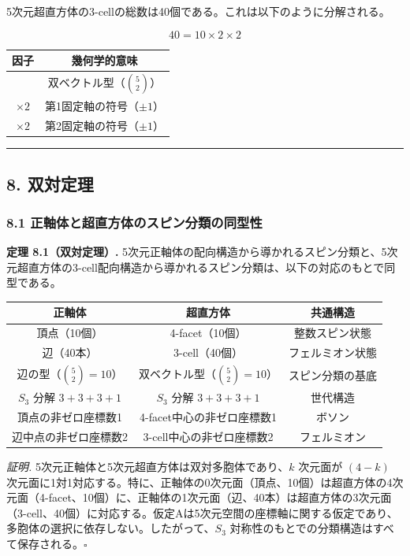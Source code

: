 \documentclass[a4paper,11pt]{ltjsarticle}
\newcounter{none}
\begin{document}
5次元超直方体の3-cellの総数は40個である。これは以下のように分解される。

\[40 = 10 \times 2 \times 2\]

{\def\LTcaptype{none}
\begin{longtable}[]{@{}cc@{}}
\toprule
因子 & 幾何学的意味 \\
\midrule
\endhead
\bottomrule
\endlastfoot
10 & 双ベクトル型（$\binom{5}{2}$） \\
$\times 2$ & 第1固定軸の符号（$\pm 1$） \\
$\times 2$ & 第2固定軸の符号（$\pm 1$） \\
\end{longtable}
}

\begin{center}\rule{0.5\linewidth}{0.5pt}\end{center}

\subsection*{8. 双対定理}

\subsubsection*{8.1 正軸体と超直方体のスピン分類の同型性}

\textbf{定理 8.1（双対定理）.} 5次元正軸体の配向構造から導かれるスピン分類と、5次元超直方体の3-cell配向構造から導かれるスピン分類は、以下の対応のもとで同型である。

{\def\LTcaptype{none}
\begin{longtable}[]{@{}ccc@{}}
\toprule
正軸体 & 超直方体 & 共通構造 \\
\midrule
\endhead
\bottomrule
\endlastfoot
頂点（10個） & 4-facet（10個） & 整数スピン状態 \\
辺（40本） & 3-cell（40個） & フェルミオン状態 \\
辺の型（$\binom{5}{2} = 10$） & 双ベクトル型（$\binom{5}{2} = 10$） & スピン分類の基底 \\
$S_3$ 分解 $3+3+3+1$ & $S_3$ 分解 $3+3+3+1$ & 世代構造 \\
頂点の非ゼロ座標数1 & 4-facet中心の非ゼロ座標数1 & ボソン \\
辺中点の非ゼロ座標数2 & 3-cell中心の非ゼロ座標数2 & フェルミオン \\
\end{longtable}
}

\emph{証明.} 5次元正軸体と5次元超直方体は双対多胞体であり、$k$ 次元面が $(4-k)$ 次元面に1対1対応する。特に、正軸体の0次元面（頂点、10個）は超直方体の4次元面（4-facet、10個）に、正軸体の1次元面（辺、40本）は超直方体の3次元面（3-cell、40個）に対応する。仮定Aは5次元空間の座標軸に関する仮定であり、多胞体の選択に依存しない。したがって、$S_3$ 対称性のもとでの分類構造はすべて保存される。$\square$
\end{document}
